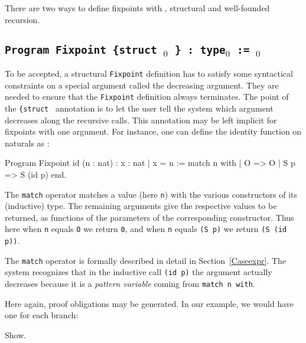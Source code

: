 There are two ways to define fixpoints with \Program{}, structural and
well-founded recursion.

\subsection{\tt Program Fixpoint {\ident} {\params} {\tt \{struct}
  \ident$_0$ {\tt \}} : type$_0$ := \term$_0$  
  \label{ProgramFixpointStruct}}

To be accepted, a structural {\tt Fixpoint} definition has to satisfy some
syntactical constraints on a special argument called the decreasing
argument. They are needed to ensure that the {\tt Fixpoint} definition
always terminates. The point of the {\tt \{struct \ident {\tt \}}}
annotation is to let the user tell the system which argument decreases
along the recursive calls. This annotation may be left implicit for
fixpoints with one argument. For instance, one can define the identity
function on naturals as :

\begin{coq_example}
Program Fixpoint id (n : nat) : { x : nat | x = n } :=
  match n with
  | O => O
  | S p => S (id p)
  end.
\end{coq_example}

The {\tt match} operator matches a value (here \verb:n:) with the
various constructors of its (inductive) type. The remaining arguments
give the respective values to be returned, as functions of the
parameters of the corresponding constructor. Thus here when \verb:n:
equals \verb:O: we return \verb:0:, and when \verb:n: equals 
\verb:(S p): we return \verb:(S (id p)):.

The {\tt match} operator is formally described
in detail in Section~\ref{Caseexpr}.  The system recognizes that in
the inductive call {\tt (id p)} the argument actually
decreases because it is a {\em pattern variable} coming from {\tt match
  n with}.

Here again, proof obligations may be generated. In our example, we would
have one for each branch:
\begin{coq_example}
Show.
\end{coq_example}


